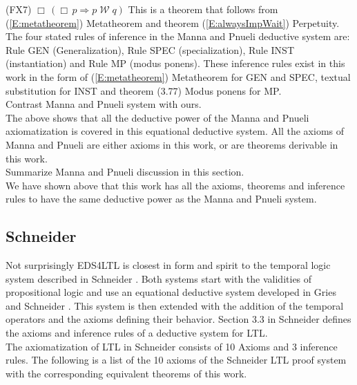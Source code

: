 \documentclass[12pt, fleqn, leqno]{article}
\newcommand{\impl}{\ensuremath{\Rightarrow}}        %
\newcommand{\Wait}{\;\mathcal{W}\;}
\newcommand{\Always}{\Box\,}
\begin{document}
(FX7) $\Always (\Always p \impl p \Wait q)$ This is a theorem that follows
from (\ref{E:metatheorem}) Metatheorem and theorem (\ref{E:alwaysImpWait}) Perpetuity.\\


The four stated rules of inference in the Manna and Pnueli deductive system are: Rule GEN (Generalization),
Rule SPEC (specialization), Rule INST (instantiation) and Rule MP (modus ponens).
These inference rules exist in this work in the form of (\ref{E:metatheorem}) Metatheorem for GEN and SPEC, textual 
substitution for INST and theorem (3.77) Modus ponens for MP.\\

Contrast Manna and Pnueli system with ours.\\

The above shows that all the deductive power of the Manna and Pnueli axiomatization is covered in this equational deductive system. All the axioms of Manna and Pnueli are either axioms in this work, or are theorems derivable in this work.\\

Summarize Manna and Pnueli discussion in this section.\\

We have shown above that this work has all the axioms, 
theorems and inference rules to have the same deductive power as the Manna and Pnueli system.\\


\subsection{Schneider}

Not surprisingly EDS4LTL is closest in form and spirit to the temporal logic system described in Schneider \cite{Schn}.
Both systems start with the validities of propositional logic and use an equational deductive system developed in
Gries and Schneider \cite{LADM}. This system is then extended with the addition of the temporal operators and the
axioms defining their behavior.
Section 3.3 in Schneider \cite{Schn} defines the axioms and inference rules of a deductive system
for LTL.\\

The axiomatization of LTL in Schneider consists of 10 Axioms and 3 inference rules. The following is
a list of the 10 axioms of the Schneider LTL proof system with the corresponding equivalent theorems of this work.\\
\end{document}
